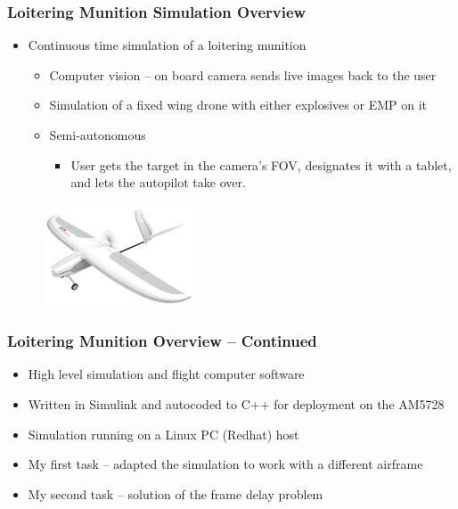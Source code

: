 \documentclass[aspectratio=169]{beamer}
\begin{document}
\begin{frame}
  \frametitle{Loitering Munition Simulation Overview}
  \begin{itemize}
  \item Continuous time simulation of a loitering munition
    \begin{itemize}
    \item Computer vision -- on board camera sends live images back to the user
    \item Simulation of a fixed wing drone with either explosives or EMP on it
    \item Semi-autonomous
      \begin{itemize}
      \item User gets the target in the camera's FOV, designates
        it with a tablet, and lets the autopilot take over.
      \end{itemize}
    \end{itemize}
  \end{itemize}
    \begin{figure}
      \includegraphics[width=0.4\textwidth]{Firebird-FPV-Fixed-Wing-Drone.jpg}
    \end{figure}
\end{frame}

\begin{frame}
  \frametitle {Loitering Munition Overview -- Continued}
  \begin{itemize}
  \item High level simulation and flight computer software 
  \item Written in Simulink and autocoded to C++ for deployment on the AM5728
  \item Simulation running on a Linux PC (Redhat) host
  \item My first task -- adapted the simulation to work with a different airframe
  \item My second task -- solution of the frame delay problem
  \end{itemize}
\end{frame}
\end{document}
